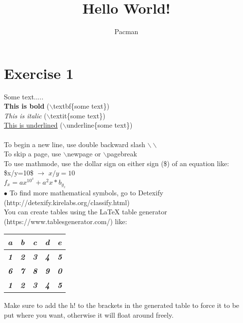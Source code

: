 \documentclass{article}
\begin{document}
\title{Hello World!}
\author{Pacman}
\maketitle

\section{Exercise 1}

Some text.....\\
\textbf{This is bold} ($\backslash$textbf\{some text\})\\
 \textit{This is italic} ($\backslash$textit\{some text\})\\
 \underline{This is underlined} ($\backslash$underline\{some text\}) \\ \\ %
To begin a new line, use double backward slash $\backslash\backslash$ \\
To skip a page, use $\backslash$newpage or $\backslash$pagebreak \\
To use mathmode, use the dollar sign on either sign (\$) of an equation like:\\
\$x/y=10\$ $\rightarrow$ $x/y=10$ \\
$f_{x} = ax^{10^x} + a^2x * b_{g_z}$\\
$\bullet$ To find more mathematical symbols, go to Detexify (http://detexify.kirelabs.org/classify.html) \\

You can create tables using the LaTeX table generator (https://www.tablesgenerator.com/) like:\\

\begin{table}[h!]
\centering
\begin{tabular}{|c|c|c|c|c|}
\hline
\textit{\textbf{a}} & \textit{\textbf{b}} & \textit{\textbf{c}} & \textit{\textbf{d}} & \textit{\textbf{e}} \\ \hline
\textit{\textbf{1}} & \textit{\textbf{2}} & \textit{\textbf{3}} & \textit{\textbf{4}} & \textit{\textbf{5}} \\ \hline
\textit{\textbf{6}} & \textit{\textbf{7}} & \textit{\textbf{8}} & \textit{\textbf{9}} & \textit{\textbf{0}} \\ \hline
\textit{\textbf{1}} & \textit{\textbf{2}} & \textit{\textbf{3}} & \textit{\textbf{4}} & \textit{\textbf{5}} \\ \hline
\end{tabular}
\end{table}
Make sure to add the h! to the brackets in the generated table to force it to be put where you want, otherwise it will float around freely.\\ \\
\end{document}
